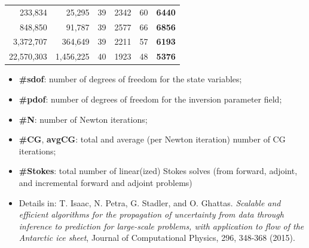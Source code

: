 \documentclass[10pt,final,xcolor=dvipsnames]{beamer}
\begin{document}
\begin{frame}
{\begin{table}
\begin{center}
\begin{tabular}{|r|r|r|r|r|r|}
        233,834 &  25,295 &  39 &  2342 &    60        &     {\bf\alert{6440}} \\
        848,850 &  91,787 &  39 &  2577 &    66        &     {\bf\alert{6856}} \\
        3,372,707 & 364,649 &  39 &  2211 &    57       &     {\bf\alert{6193}} \\
        22,570,303 & 1,456,225 &  40 &  1923 &    48     &     {\bf\alert{5376}}\\
        \hline
  \end{tabular}
\end{center}
\end{table}
  }
  
\small
\begin{itemize}
\item {\bf \#sdof}: number of degrees of freedom for the
  state variables;
\item {\bf \#pdof}: number of degrees of freedom for the
  inversion parameter field;
\item {\bf \#N}: number of Newton iterations;
\item {\bf \#CG}, {\bf avgCG}: total and average (per Newton
  iteration) number of CG iterations;
\item {\bf \#Stokes}: total number of
  linear(ized) Stokes solves (from forward, adjoint, and incremental
  forward and adjoint problems)
\end{itemize}

\begin{itemize}
\item [] \scriptsize{Details in: T. Isaac, N. Petra, G. Stadler, and
  O. Ghattas. {\em Scalable and efficient algorithms for the
    propagation of uncertainty from data through inference to
    prediction for large-scale problems, with application to flow of
    the Antarctic ice sheet}, Journal of Computational Physics, 296,
  348-368 (2015).}
\end{itemize}

\end{frame}
\end{document}
